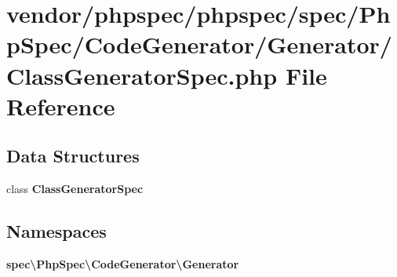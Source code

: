 \section{vendor/phpspec/phpspec/spec/\+Php\+Spec/\+Code\+Generator/\+Generator/\+Class\+Generator\+Spec.php File Reference}
\label{_class_generator_spec_8php}
\subsection*{Data Structures}
\begin{DoxyCompactItemize}
\item 
class {\bf Class\+Generator\+Spec}
\end{DoxyCompactItemize}
\subsection*{Namespaces}
\begin{DoxyCompactItemize}
\item 
 {\bf spec\textbackslash{}\+Php\+Spec\textbackslash{}\+Code\+Generator\textbackslash{}\+Generator}
\end{DoxyCompactItemize}
